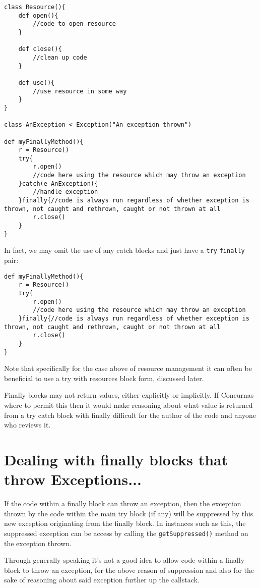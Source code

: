 \documentclass[conc-doc]{subfiles}
\begin{document}
\begin{lstlisting}
class Resource(){
	def open(){
		//code to open resource
	}
	
	def close(){
		//clean up code
	}
	
	def use(){
		//use resource in some way
	}
}

class AnException < Exception("An exception thrown")

def myFinallyMethod(){
	r = Resource()
	try{
		r.open()
		//code here using the resource which may throw an exception
	}catch(e AnException){
		//handle exception
	}finally{//code is always run regardless of whether exception is thrown, not caught and rethrown, caught or not thrown at all 
		r.close()
	}
}
\end{lstlisting}

In fact, we may omit the use of any catch blocks and just have a \lstinline{try} \lstinline{finally} pair:

\begin{lstlisting}
def myFinallyMethod(){
	r = Resource()
	try{
		r.open()
		//code here using the resource which may throw an exception
	}finally{//code is always run regardless of whether exception is thrown, not caught and rethrown, caught or not thrown at all 
		r.close()
	}
}
\end{lstlisting}

Note that specifically for the case above of resource management it can often be beneficial to use a try with resources block form, discussed later.

Finally blocks may not return values, either explicitly or implicitly. If Concurnas where to permit this then it would make reasoning about what value is returned from a try catch block with finally difficult for the author of the code and anyone who reviews it.

\section{Dealing with finally blocks that throw Exceptions...}
If the code within a finally block can throw an exception, then the exception thrown by the code within the main try block (if any) will be suppressed by this new exception originating from the finally block. In instances such as this, the suppressed exception can be access by calling the \lstinline{getSuppressed()} method on the exception thrown.

Through generally speaking it's not a good idea to allow code within a finally block to throw an exception, for the above reason of suppression and also for the sake of reasoning about said exception further up the callstack.
\end{document}
